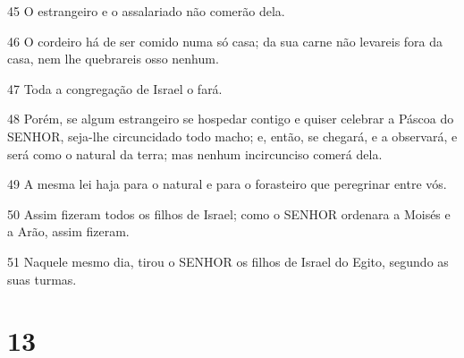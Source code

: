 \par 45 O estrangeiro e o assalariado não comerão dela.
\par 46 O cordeiro há de ser comido numa só casa; da sua carne não levareis fora da casa, nem lhe quebrareis osso nenhum.
\par 47 Toda a congregação de Israel o fará.
\par 48 Porém, se algum estrangeiro se hospedar contigo e quiser celebrar a Páscoa do SENHOR, seja-lhe circuncidado todo macho; e, então, se chegará, e a observará, e será como o natural da terra; mas nenhum incircunciso comerá dela.
\par 49 A mesma lei haja para o natural e para o forasteiro que peregrinar entre vós.
\par 50 Assim fizeram todos os filhos de Israel; como o SENHOR ordenara a Moisés e a Arão, assim fizeram.
\par 51 Naquele mesmo dia, tirou o SENHOR os filhos de Israel do Egito, segundo as suas turmas.

\chapter{13}

